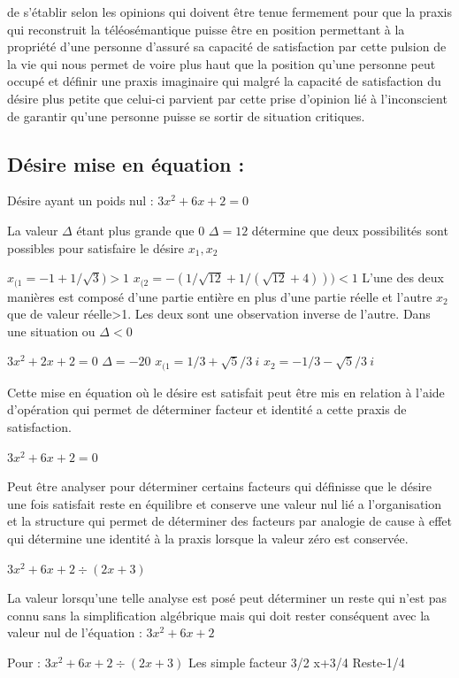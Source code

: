 \documentclass[12pt,a4paper]{article}
\begin{document}
de s’établir selon les opinions qui doivent être tenue fermement pour que la praxis qui reconstruit la téléosémantique puisse être en position permettant à la propriété d’une personne d’assuré sa capacité de satisfaction par cette pulsion de la vie qui nous permet de voire plus haut que la position qu’une personne peut occupé et définir une praxis imaginaire qui malgré la capacité de satisfaction du désire plus petite que celui-ci parvient par cette prise d’opinion lié à l’inconscient de garantir qu’une personne puisse se sortir de situation critiques.

\subsection*{Désire mise en équation :}
Désire ayant un poids nul : $3x^2+6x+2=0$



La valeur $\Delta$ étant plus grande que 0 $\Delta=12$ détermine que deux possibilités sont possibles pour satisfaire le désire $x_1,x_2$

$x_{(1}=-1+1/\sqrt{3})>1$
$x_{(2}=- (1/\sqrt{12}+1/(\sqrt{12}+4)))<1$
L’une des deux manières est composé d’une partie entière en plus d’une partie réelle et l’autre $x_2$ que de valeur réelle>1. Les deux sont une observation inverse de l’autre.
Dans une situation ou $\Delta<0$

$3x^2+2x+2=0$
$\Delta=-20$
$x_{(1}=1/3+\sqrt{5}/3\ i$
$x_2=-1/3-\sqrt{5}/3\ i$

Cette mise en équation où le désire est satisfait peut être mis en relation à l’aide d’opération qui permet de déterminer facteur et identité a cette praxis de satisfaction.

$3x^2+6x+2=0$

Peut être analyser pour déterminer certains facteurs qui définisse que le désire une fois satisfait reste en équilibre et conserve une valeur nul lié a l’organisation et la structure qui permet de déterminer des facteurs par analogie de cause à effet qui détermine une identité à la praxis lorsque la valeur zéro est conservée.


$3x^2+6x+2\div(2x+3)$

La valeur lorsqu’une telle analyse est posé peut déterminer un reste qui n’est pas connu sans la simplification algébrique mais qui doit rester conséquent avec la valeur nul de l’équation : $3x^2+6x+2$

Pour :
$3x^2+6x+2\div(2x+3)$
Les simple facteur 3/2 x+3/4  Reste-1/4
\end{document}
